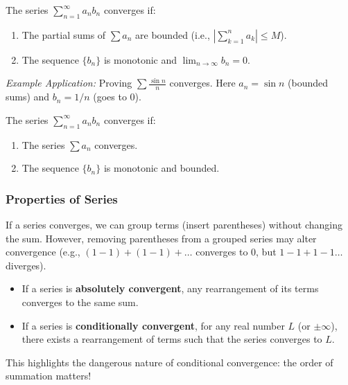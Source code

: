 \begin{theorem}
The series $\sum_{n=1}^{\infty} a_n b_n$ converges if:
\begin{enumerate}
    \item The partial sums of $\sum a_n$ are bounded (i.e., $|\sum_{k=1}^n a_k| \le M$).
    \item The sequence $\{b_n\}$ is monotonic and $\lim_{n \to \infty} b_n = 0$.
\end{enumerate}
\end{theorem}
\textit{Example Application:} Proving $\sum \frac{\sin n}{n}$ converges. Here $a_n = \sin n$ (bounded sums) and $b_n = 1/n$ (goes to 0).

\begin{theorem}
The series $\sum_{n=1}^{\infty} a_n b_n$ converges if:
\begin{enumerate}
    \item The series $\sum a_n$ converges.
    \item The sequence $\{b_n\}$ is monotonic and bounded.
\end{enumerate}
\end{theorem}

\subsubsection{Properties of Series}

\begin{theorem}[Associativity]
If a series converges, we can group terms (insert parentheses) without changing the sum. However, removing parentheses from a grouped series may alter convergence (e.g., $(1-1)+(1-1)+\dots$ converges to 0, but $1-1+1-1\dots$ diverges).
\end{theorem}

\begin{theorem}
\begin{itemize}
    \item If a series is \textbf{absolutely convergent}, any rearrangement of its terms converges to the same sum.
    \item If a series is \textbf{conditionally convergent}, for any real number $L$ (or $\pm \infty$), there exists a rearrangement of terms such that the series converges to $L$.
\end{itemize}
This highlights the dangerous nature of conditional convergence: the order of summation matters!
\end{theorem}

